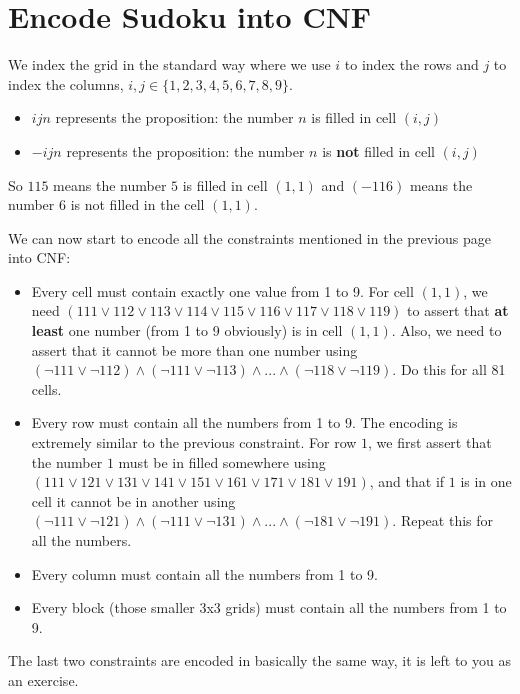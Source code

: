 \documentclass[a4paper]{tufte-book}
\begin{document}
\section{Encode Sudoku into CNF}
We index the grid in the standard way where we use $i$ to index the rows and $j$ to index the columns, $i,j\in \{1,2,3,4,5,6,7,8,9\}$. 
\begin{itemize}
\item $ijn$ represents the proposition: the number $n$ is filled in cell $(i, j)$
\item $-ijn$ represents the proposition: the number $n$ is \textbf{not} filled in cell $(i, j)$
\end{itemize}

So $115$ means the number $5$ is filled in cell $(1,1)$ and $(-116)$ means the number $6$ is not filled in the cell $(1,1)$. 

We can now start to encode all the constraints mentioned in the previous page into CNF:
\begin{itemize}
\item Every cell must contain exactly one value from 1 to 9. For cell $(1,1)$, we need $(111 \lor 112 \lor 113 \lor 114 \lor 115 \lor116 \lor117 \lor118 \lor119)$ to assert that \textbf{at least} one number (from 1 to 9 obviously) is in cell $(1,1)$. Also, we need to assert that it cannot be more than one number using \mbox{$(\neg 111 \lor \neg 112) \land (\neg 111 \lor \neg 113) \land ... \land (\neg 118 \lor \neg 119)$}. Do this for all 81 cells.
\item Every row must contain all the numbers from 1 to 9. The encoding is extremely similar to the previous constraint. For row $1$, we first assert that the number $1$  must be in filled somewhere using \mbox{$(111 \lor 121 \lor 131 \lor 141 \lor 151 \lor161 \lor171 \lor181 \lor191)$}, and that if $1$ is in one cell it cannot be in another using \mbox{$(\neg 111 \lor \neg 121) \land (\neg 111 \lor \neg 131) \land ... \land (\neg 181 \lor \neg 191)$}. Repeat this for all the numbers.
\item Every column must contain all the numbers from 1 to 9. 
\item Every block (those smaller 3x3 grids) must contain all the numbers from 1 to 9.
\end{itemize}

The last two constraints are encoded in basically the same way, it is left to you as an exercise.
\end{document}
